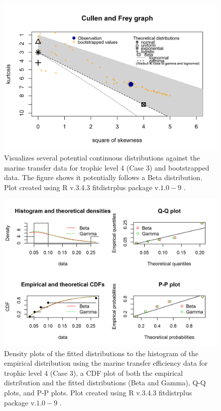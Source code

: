 \documentclass[oneside,12pt,final]{sty/ucthesis-CA2012}
\let\cite\citep                             %
\begin{document}
\begin{mainmatter}
\begin{figure}[H]
     \centering
       \includegraphics[width=.8\textwidth]{fig/cullen_frey_te4}
    \caption{Visualizes several potential continuous distributions against the marine transfer data for trophic level 4 (Case 3) and bootstrapped data. The figure shows it potentially follows a Beta distribution. Plot created using R v.3.4.3 \cite{Rcite} fitdistrplus package v.$1.0-9$ \cite{fitdistrplus}. }
    \label{cf_te4}
\end{figure}

\begin{figure}[H]
     \centering
       \includegraphics[width=.8\textwidth]{fig/gof_te4}
    \caption{Density plots of the fitted distributions to the histogram of the empirical distribution using the marine transfer efficiency data for trophic level 4 (Case 3), a CDF plot of both the empirical distribution and the fitted distributions (Beta and Gamma), Q-Q plots, and P-P plots. Plot created using R v.3.4.3 \cite{Rcite} fitdistrplus package v.$1.0-9$ \cite{fitdistrplus}. }
    \label{gof_te4}
\end{figure}


\end{mainmatter}
\end{document}
